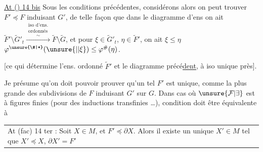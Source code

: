
\uline{At () 14 bis} Sous les conditions précédentes,  considérons
alors on peut trouver $F'\preccurlyeq F$ induisant $G'$, de telle façon que dans le diagramme d'ens 
on ait $\widetilde F'\setminus\widetilde G'_{t}\overset{\substack{\text{iso d'ens.}\\\text{ordonnés}}}{\xrightarrow{\sim}}\widetilde F\setminus\widetilde G$, et pour $\xi\in\widetilde G'_{t}$, $\eta\in\widetilde F'$, on ait $\xi\leq\eta$  $\varphi^{\unsure{\#|*}}(\unsure{\vert|\xi})\leq\varphi^{\#}(\eta)$.

[ce qui détermine l'ens. ordonné $\widetilde F'$ et le diagramme précé\uline{dent,} à iso unique près].

Je présume qu'on doit pouvoir prouver qu'un tel $F'$ est unique, comme la plus grande des subdivisions de $F$ induisant $G'$ sur $G$.%
 Dans  cas où $\unsure{\mathcal F|\exists}$ est à figures finies (pour  des inductions transfinies \ldots),  condition doit être équivalente à

\noindent\begin{tabular}{@{}||p{.90\linewidth}@{}}
At (fac) 14 ter : Soit $X\in M$, et $F'\preccurlyeq\partial X$. Alors il existe un unique $X'\in M$ tel que $X'\preccurlyeq X$, $\partial X'=F'$
\end{tabular}

